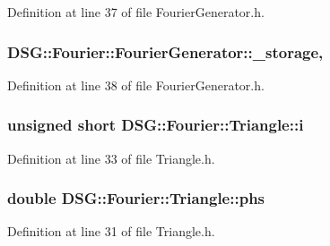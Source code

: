 Definition at line 37 of file Fourier\-Generator.\-h.

\hypertarget{classDSG_1_1Fourier_1_1FourierGenerator_a43799227375e2d8b1354682e3a4fc935}{
\subsubsection[{\-\_\-storage}]{ D\-S\-G\-::\-Fourier\-::\-Fourier\-Generator\-::\-\_\-storage\hspace{0.3cm}{\ttfamily [protected]}, {\ttfamily [inherited]}}}\label{classDSG_1_1Fourier_1_1FourierGenerator_a43799227375e2d8b1354682e3a4fc935}


Definition at line 38 of file Fourier\-Generator.\-h.

\hypertarget{classDSG_1_1Fourier_1_1Triangle_af81a809f2d901e42a398f13f090a5472}{
\subsubsection[{i}]{\setlength{\rightskip}{0pt plus 5cm}unsigned short D\-S\-G\-::\-Fourier\-::\-Triangle\-::i\hspace{0.3cm}{\ttfamily [protected]}}}\label{classDSG_1_1Fourier_1_1Triangle_af81a809f2d901e42a398f13f090a5472}


Definition at line 33 of file Triangle.\-h.

\hypertarget{classDSG_1_1Fourier_1_1Triangle_aa2f376ac6bb99284a5ff97a5e9adaec9}{
\subsubsection[{phs}]{\setlength{\rightskip}{0pt plus 5cm}double D\-S\-G\-::\-Fourier\-::\-Triangle\-::phs\hspace{0.3cm}{\ttfamily [protected]}}}\label{classDSG_1_1Fourier_1_1Triangle_aa2f376ac6bb99284a5ff97a5e9adaec9}


Definition at line 31 of file Triangle.\-h.

